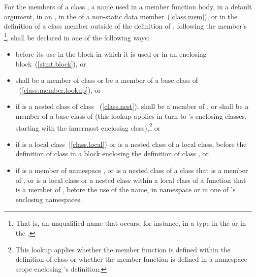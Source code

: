 \pnum
For the members of a class , a name used in a member function
body, in a default argument, in an , in the
 of a non-static data
member~(\ref{class.mem}), or in the definition of a class member
outside of the definition of , following the
member's
\footnote{That is, an unqualified name that occurs,
for instance, in a
type in the
 or in the
.}, shall be declared in one of the
following ways:

\begin{itemize}
\item before its use in the block in which it is used or in an enclosing
block~(\ref{stmt.block}), or

\item shall be a member of class  or be a member of a base
class of ~(\ref{class.member.lookup}), or

\item if 
is a nested class of class ~(\ref{class.nest}), shall be a
member of , or shall be a member of a base class of 
(this lookup applies in turn to 's enclosing classes, starting
with the innermost enclosing class),\footnote{This lookup applies whether
the member function is defined
within the definition of class  or whether the member function
is defined in a namespace scope enclosing 's definition.}
or

\item if  is a local class~(\ref{class.local}) or is a nested
class of a local class, before the definition of class  in a
block enclosing the definition of class , or

\item if  is a member of namespace , or is a nested
class of a class that is a member of , or is a local class or a
nested class within a local class of a function that is a member of
, before the use of the name, in namespace 
or in one of  's enclosing namespaces.
\end{itemize}

